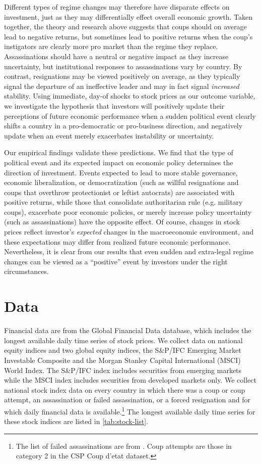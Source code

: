 \documentclass[12pt,final,fleqn]{article}
\theoremstyle{plain}
\begin{document}
Different types of regime changes may therefore have disparate effects on investment, just as they may differentially effect overall economic growth. Taken together, the theory and research above suggests that coups should on average lead to negative returns, but sometimes lead to positive returns when the coup's instigators are clearly more pro market than the regime they replace. Assassinations should have a neutral or negative impact as they increase uncertainty, but institutional responses to assassinations vary by country. By contrast, resignations may be viewed positively on average, as they typically signal the departure of an ineffective leader and may in fact signal \textit{increased} stability. Using immediate, day-of shocks to stock prices as our outcome variable, we investigate the hypothesis that investors will positively update their perceptions of future economic performance when a sudden political event clearly shifts a country in a pro-democratic or pro-business direction, and negatively update when an event merely exacerbates instability or uncertainty.

Our empirical findings validate these predictions. We find that the type of political event and its expected impact on economic policy determines the direction of investment. Events expected to lead to more stable governance, economic liberalization, or democratization (such as willful resignations and coups that overthrow protectionist or leftist autocrats) are associated with positive returns, while those that consolidate authoritarian rule (e.g. military coups), exacerbate poor economic policies, or merely increase policy uncertainty (such as assassinations) have the opposite effect. Of course, changes in stock prices reflect investor's \textit{expected} changes in the macroeconomic environment, and these expectations may differ from realized future economic performance. Nevertheless, it is clear from our results that even sudden and extra-legal regime changes can be viewed as a ``positive'' event by investors under the right circumstances.

\section{Data}

Financial data are from the Global Financial Data database, which includes the longest available daily time series of stock prices. We collect data on national equity indices and two global equity indices, the S\&P/IFC Emerging Market Investable Composite and the Morgan Stanley Capital International (MSCI) World Index. The S\&P/IFC index includes securities from emerging markets while the MSCI index includes securities from developed markets only. We collect national stock index data on every country in which there was a coup or coup attempt, an assassination or failed assassination, or a forced resignation and for which daily financial data is available.\footnote{The list of failed assassinations are from \citet{jones2009hit}. Coup attempts are those in category 2 in the CSP Coup d'etat dataset.} The longest available daily time series for these stock indices are listed in \autoref{tab:stock-list}.
\end{document}

